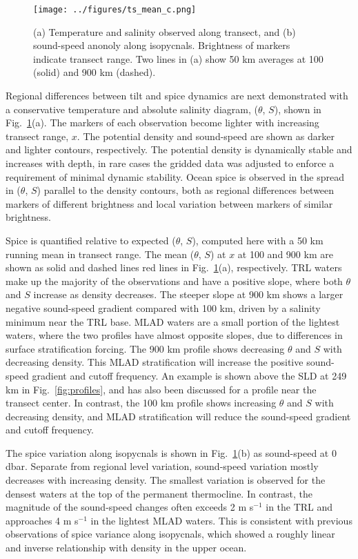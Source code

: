 \documentclass[preprint,NumberedRefs]{JASA}
\begin{document}
\begin{figure}
\texttt{[image: ../figures/ts\_mean\_c.png]}
    \caption{\label{fig:ts_diagram}{(a) Temperature and salinity observed along transect, and (b) sound-speed anonoly along isopycnals. Brightness of markers indicate transect range. Two lines in (a) show 50 km averages at 100 (solid) and 900 km (dashed).}}
\end{figure}
Regional differences between tilt and spice dynamics are next demonstrated with a conservative temperature and absolute salinity diagram,\cite{TEOS10} ($\theta$, $S$), shown in Fig.~\ref{fig:ts_diagram}(a). The markers of each observation become lighter with increasing transect range, $x$. The potential density and sound-speed are shown as darker and lighter contours, respectively. The potential density is dynamically stable and increases with depth, in rare cases the gridded data was adjusted to enforce a requirement of minimal dynamic stability.\citep{barker2017stabilizing} Ocean spice is observed in the spread in ($\theta$, $S$) parallel to the density contours, both as regional differences between markers of different brightness and local variation between markers of similar brightness.

Spice is quantified relative to expected ($\theta$, $S$), computed here with a 50 km running mean in transect range. The mean ($\theta$, $S$) at $x$ at 100 and 900 km are shown as solid and dashed lines red lines in Fig.~\ref{fig:ts_diagram}(a), respectively. TRL waters make up the majority of the observations and have a positive slope, where both $\theta$ and $S$ increase as density decreases. The steeper slope at 900 km shows a larger negative sound-speed gradient compared with 100 km, driven by a salinity minimum near the TRL base. MLAD waters are a small portion of the lightest waters, where the two profiles have almost opposite slopes, due to differences in surface stratification forcing.\cite{colosi2020observations} The 900 km profile shows decreasing $\theta$ and $S$ with decreasing density. This MLAD stratification will increase the positive sound-speed gradient and cutoff frequency. An example is shown above the SLD at 249 km in Fig.~\ref{fig:profiles}, and has also been discussed for a profile near the transect center.\cite{colosi2020observations} In contrast, the 100 km profile shows increasing $\theta$ and $S$ with decreasing density, and MLAD stratification will reduce the sound-speed gradient and cutoff frequency.

The spice variation along isopycnals is shown in Fig.~\ref{fig:ts_diagram}(b) as sound-speed at 0 dbar. Separate from regional level variation, sound-speed variation mostly decreases with increasing density. The smallest variation is observed for the densest waters at the top of the permanent thermocline.\cite{cole2010seasonal} In contrast, the magnitude of the sound-speed changes often exceeds 2 m s$^{-1}$ in the TRL and approaches 4 m s$^{-1}$ in the lightest MLAD waters. This is consistent with previous observations of spice variance along isopycnals, which showed a roughly linear and inverse relationship with density in the upper ocean.\cite{ferrari2000}
\end{document}
